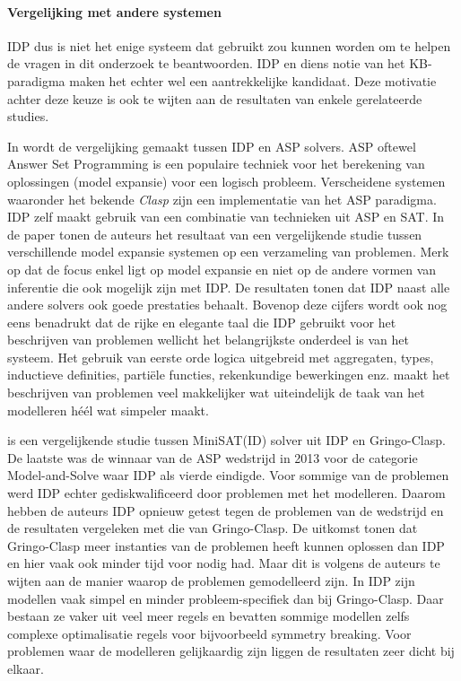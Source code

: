 \paragraph{Vergelijking met andere systemen}
IDP dus is niet het enige systeem dat gebruikt zou kunnen worden om te helpen de vragen in dit onderzoek te beantwoorden. IDP en diens notie van het KB-paradigma maken het echter wel een aantrekkelijke kandidaat. Deze motivatie achter deze keuze is ook te wijten aan de resultaten van enkele gerelateerde studies. 

In \citep{wittocx2008idp} wordt de vergelijking gemaakt tussen IDP en ASP solvers. ASP oftewel Answer Set Programming is een populaire techniek voor het berekening van oplossingen (model expansie) voor een logisch probleem. Verscheidene systemen waaronder het bekende \textit{Clasp} zijn een implementatie van het ASP paradigma. IDP zelf maakt gebruik van een combinatie van technieken uit ASP en SAT. In de paper tonen de auteurs het resultaat van een vergelijkende studie tussen verschillende model expansie systemen op een verzameling van problemen. Merk op dat de focus enkel ligt op model expansie en niet op de andere vormen van inferentie die ook mogelijk zijn met IDP. De resultaten tonen dat IDP naast alle andere solvers ook goede prestaties behaalt. Bovenop deze cijfers wordt ook nog eens benadrukt dat de rijke en elegante taal die IDP gebruikt voor het beschrijven van problemen wellicht het belangrijkste onderdeel is van het systeem. Het gebruik van eerste orde logica uitgebreid met aggregaten, types, inductieve definities, parti\"{e}le functies, rekenkundige bewerkingen enz. maakt het beschrijven van problemen veel makkelijker wat uiteindelijk de taak van het modelleren h\'{e}\'{e}l wat simpeler maakt.

\citep{de2014minisat} is een vergelijkende studie tussen MiniSAT(ID) solver uit IDP en Gringo-Clasp. De laatste was de winnaar van de ASP wedstrijd in 2013 voor de categorie Model-and-Solve waar IDP als vierde eindigde. Voor sommige van de problemen werd IDP echter gediskwalificeerd door problemen met het modelleren. Daarom hebben de auteurs IDP opnieuw getest tegen de problemen van de wedstrijd en de resultaten vergeleken met die van Gringo-Clasp. De uitkomst tonen dat Gringo-Clasp meer instanties van de problemen heeft kunnen oplossen dan IDP en hier vaak ook minder tijd voor nodig had. Maar dit is volgens de auteurs te wijten aan de manier waarop de problemen gemodelleerd zijn. In IDP zijn modellen vaak simpel en minder probleem-specifiek dan bij Gringo-Clasp. Daar bestaan ze vaker uit veel meer regels en bevatten sommige modellen zelfs complexe optimalisatie regels voor bijvoorbeeld symmetry breaking. Voor problemen waar de modelleren gelijkaardig zijn liggen de resultaten zeer dicht bij elkaar. 

